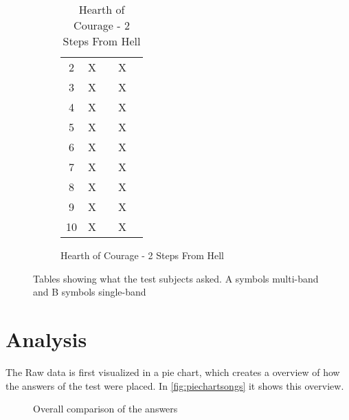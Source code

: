 \begin{figure}[H]
\begin{subfigure}[t]{0.20\textwidth}
\begin{table}[H]
\begin{tabular}{ccccc}
2          & X         &           & X         &          \\
3          & X         &           & X         &          \\
4          & X         &           & X         &          \\ 
5          & X         &           & X         &          \\ \hline
6          & X         &           & X         &          \\
7          & X         &           & X         &          \\
8          & X         &           & X         &          \\
9          & X         &           & X         &          \\
10         & X         &           & X         &          \\ \bottomrule
\end{tabular}
\caption{Hearth of Courage - 2 Steps From Hell}
\label{tab:HearthofCourage}
\end{table}
\end{subfigure}

\caption{Tables showing what the test subjects asked. A symbols multi-band and B symbols single-band}
\label{tab:combinedanswers}
\end{figure}  


\section{Analysis}
The Raw data is first visualized in a pie chart, which creates a overview of how the answers of the test were placed. In \autoref{fig:piechartsongs} it shows this overview.
\begin{figure}[H]
\centering
{}
\caption{Overall comparison of the answers}
\label{fig:piechartsongs}
\end{figure}

